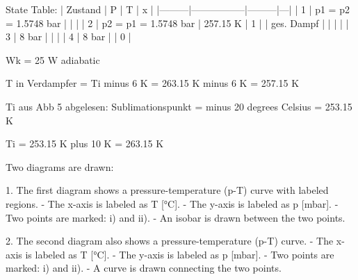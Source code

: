 State Table:  
| Zustand | P               | T       | x |  
|---------|-----------------|---------|---|  
| 1       | p1 = p2 = 1.5748 bar |         |   |  
| 2       | p2 = p1 = 1.5748 bar | 257.15 K | 1 |  
| ges. Dampf |                 |         |   |  
| 3       | 8 bar           |         |   |  
| 4       | 8 bar           |         | 0 |  

Wk = 25 W adiabatic  

T in Verdampfer = Ti minus 6 K = 263.15 K minus 6 K = 257.15 K  

Ti aus Abb 5 abgelesen: Sublimationspunkt = minus 20 degrees Celsius = 253.15 K  

Ti = 253.15 K plus 10 K = 263.15 K

Two diagrams are drawn:  

1. The first diagram shows a pressure-temperature (p-T) curve with labeled regions.  
- The x-axis is labeled as T [°C].  
- The y-axis is labeled as p [mbar].  
- Two points are marked: i) and ii).  
- An isobar is drawn between the two points.  

2. The second diagram also shows a pressure-temperature (p-T) curve.  
- The x-axis is labeled as T [°C].  
- The y-axis is labeled as p [mbar].  
- Two points are marked: i) and ii).  
- A curve is drawn connecting the two points.